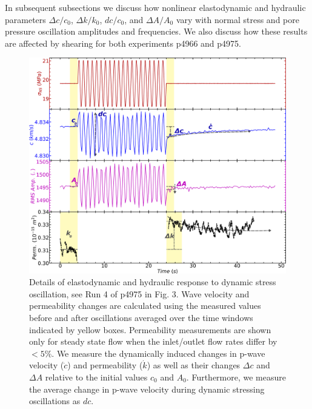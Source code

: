 \documentclass[draft]{agujournal2019}
\begin{document}


In subsequent subsections we discuss how nonlinear elastodynamic and hydraulic parameters $\Delta c/c_0$, $ \Delta k/k_0 $, $dc/c_0$, and $\Delta A/A_0$ vary with normal stress and pore pressure oscillation amplitudes and frequencies. We also discuss how these results are affected by shearing for both experiments p4966 and p4975.

\newpage

\begin{figure}[ht]
	\centering
	\includegraphics[width=0.9\columnwidth]{NsVelRmsPerm_v2_edit}
	\caption[]{Details of elastodynamic and hydraulic response to dynamic stress oscillation, see Run 4 of p4975 in Fig. 3. Wave velocity and permeability changes are calculated using the measured values before and after oscillations averaged over the time windows indicated by yellow boxes. Permeability measurements are shown only for steady state flow when the inlet/outlet flow rates differ by $ < 5 \% $. We measure the dynamically induced changes in p-wave velocity ($ \dot c$) and permeability ($\dot k$) as well as their changes $\Delta c$ and $\Delta A$ relative to the initial values $c_0$ and $A_0$. Furthermore, we measure the average change in p-wave velocity during dynamic stressing oscillations as $ dc $.}
	\label{fig:delc_delk_calc}
\end{figure}
\end{document}
